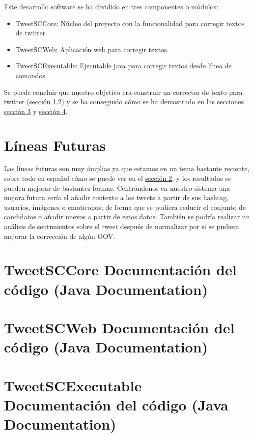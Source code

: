 \documentclass[spanish,12pt, a4paper,twoside]{paper}
\let\oldsection\section
\def\section{\cleardoublepage\oldsection}
\begin{document}
Este desarrollo software se ha dividido en tres componentes o módulos:
\begin{itemize}
	\item TweetSCCore: Núcleo del proyecto con la funcionalidad para corregir textos de twitter.
	\item TweetSCWeb: Aplicación web para corregir textos.
	\item TweetSCExecutable: Ejecutable java para corregir textos desde línea de comandos.
\end{itemize}
Se puede concluir que nuestro objetivo era construir un corrector de texto para twitter (\hyperref[sec:objetivos]{sección 1.2}) y se ha conseguido cómo se ha demostrado en las secciones \hyperref[sec:solucionpropuesta]{sección 3} y \hyperref[sec:implementacion]{sección 4}.

\section{Líneas Futuras}\label{sec:lineasfuturas}
Las líneas futuras son muy ámplias ya que estamos en un tema bastante reciente, sobre todo en español cómo se puede ver en el \hyperref[sec:estadodelarte]{sección 2}, y los resultados se pueden mejorar de bastantes formas. Centrándonos en nuestro sistema una mejora futura sería el añadir contexto a los tweets a partir de sus hashtag, usuarios, imágenes o emoticonos; de forma que se pudiera reducir el conjunto de candidatos o añadir nuevos a partir de estos datos. También se podría realizar un análisis de sentimientos sobre el tweet después de normalizar por si se pudiera mejorar la corrección de algún OOV.

\section{TweetSCCore Documentación del código (Java Documentation)}\label{sec:tweetsccorejavadoc}


\section{TweetSCWeb Documentación del código (Java Documentation)}\label{sec:tweetscwebjavadoc}


\section{TweetSCExecutable Documentación del código (Java Documentation)}\label{sec:tweetscexecutablejavadoc}

\end{document}
